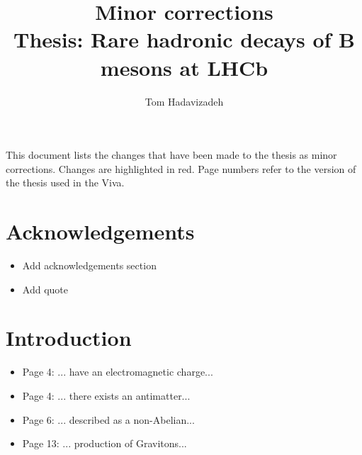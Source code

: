 \documentclass[12pt]{article}
\title{Minor corrections\\
Thesis: Rare hadronic decays of B mesons at LHCb}
\author{Tom Hadavizadeh}
\begin{document}
\maketitle

This document lists the changes that have been made to the thesis as minor corrections. Changes are highlighted in red. Page numbers refer to the version of the thesis used in the Viva. 

\section{Acknowledgements}

\begin{itemize}
\item {\color{blue} Add acknowledgements section}
\item {\color{blue} Add quote}

\end{itemize}
\section{Introduction}



\begin{itemize}
\item Page 4: ... have {\color{red}an} electromagnetic charge...
\item Page 4: ... there exists {\color{red}an} antimatter...
\item Page 6: ... described {\color{red}as} a non-Abelian...
\item Page 13: ... production {\color{red}of} Gravitons...
\end{itemize}
\end{document}
